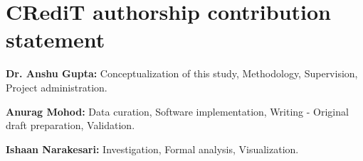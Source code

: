 \documentclass[a4paper,fleqn]{cas-sc}
\begin{document}
\FloatBarrier

\appendix
\section{CRediT authorship contribution statement}

\textbf{Dr. Anshu Gupta:} Conceptualization of this study, Methodology, Supervision, Project administration.

\textbf{Anurag Mohod:} Data curation, Software implementation, Writing - Original draft preparation, Validation.

\textbf{Ishaan Narakesari:} Investigation, Formal analysis, Visualization.

\printcredits

%

\end{document}
